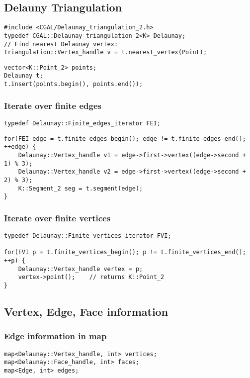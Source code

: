 \documentclass[11pt]{article}
\begin{document}
\subsection{Delauny Triangulation}
\begin{lstlisting}
#include <CGAL/Delaunay_triangulation_2.h>
typedef CGAL::Delaunay_triangulation_2<K> Delaunay;
// Find nearest Delaunay vertex:
Triangulation::Vertex_handle v = t.nearest_vertex(Point);
\end{lstlisting}

\begin{lstlisting}
vector<K::Point_2> points;
Delaunay t;
t.insert(points.begin(), points.end());
\end{lstlisting}

\subsubsection{Iterate over finite edges}
\begin{lstlisting}
typedef Delaunay::Finite_edges_iterator FEI;
\end{lstlisting}

\begin{lstlisting}
for(FEI edge = t.finite_edges_begin(); edge != t.finite_edges_end(); ++edge) {
    Delaunay::Vertex_handle v1 = edge->first->vertex((edge->second + 1) % 3);
    Delaunay::Vertex_handle v2 = edge->first->vertex((edge->second + 2) % 3);
    K::Segment_2 seg = t.segment(edge);
}
\end{lstlisting}


    
\subsubsection{Iterate over finite vertices}
\begin{lstlisting}
typedef Delaunay::Finite_vertices_iterator FVI;

for(FVI p = t.finite_vertices_begin(); p != t.finite_vertices_end(); ++p) {
    Delaunay::Vertex_handle vertex = p;
    vertex->point();    // returns K::Point_2
}
\end{lstlisting}

\subsection{Vertex, Edge, Face information}

\subsubsection{Edge information in map}
\begin{lstlisting}
map<Delaunay::Vertex_handle, int> vertices;
map<Delaunay::Face_handle, int> faces;
map<Edge, int> edges;
\end{lstlisting}
\end{document}
